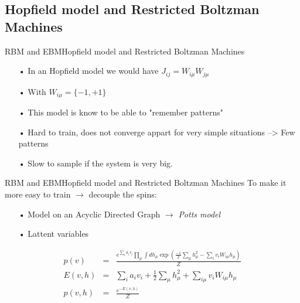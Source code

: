 \documentclass{beamer}
\begin{document}
\subsection{Hopfield model and Restricted Boltzman Machines}
\begin{frame}{RBM and EBM}{Hopfield model and Restricted Boltzman Machines}

\begin{itemize}
\item[•] In an Hopfield model we would have $J_{ij} = W_{i\mu} W_{j\mu}$
\item[•] With $W_{i\mu}= \{ -1,+1 \}$
\item[•] This model is know to be able to "remember patterns"
\item[•] Hard to train, does not converge appart for very simple situations --> Few patterns
\item[•] Slow to sample if the system is very big.
\end{itemize}
\end{frame}


\begin{frame}{RBM and EBM}{Hopfield model and Restricted Boltzman Machines}
To make it more easy to train $\rightarrow$ decouple the spins:

\begin{itemize}
\item[•] Model on an Acyclic Directed Graph $\rightarrow$ \emph{Potts model}
\item[•] Lattent variables
\end{itemize}

\begin{eqnarray}
	p(v) & = & \frac{e^{ \sum_i a_i v_i} \prod_{\mu} \int dh_{\mu} \exp\left(\frac{-1}{2} \sum_\mu h_{\mu}^2 - \sum_i v_i W_{i\mu} h_\mu\right)}{Z} \\
	E(v,h) & = & \sum_i a_i v_i + \frac{1}{2} \sum_\mu h_{\mu}^2  + \sum_{i\mu} v_i W_{i\mu} h_{\mu} \\
	p(v,h) & = & \frac{e^{-E(v,h)}}{Z}
\end{eqnarray}

\end{frame}
\end{document}
